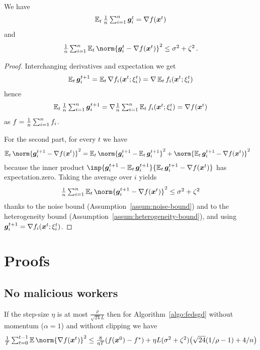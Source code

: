 \documentclass{article}
\begin{document}
\begin{lemma}\label{lem:gradient-bounds}
  We have
  \[
    \operatorname{\operatorname{\mathbb{E}}}_t \tfrac{1}{n} \textstyle\sum_{i=1}^n \bm{g}_i^t = \nabla f(\bm{x}^t)
  \]
  and
  \[
    \tfrac{1}{n} \tsum_{i=1}^n \E_t \norm{\gg_i^t - \nabla f(\xx^t)}^2 \le \sigma^2 + \zeta^2 \, .
  \]
\end{lemma}

\begin{proof}
  Interchanging derivatives and expectation we get
  \[
    \operatorname{\operatorname{\mathbb{E}}}_t \bm{g}_i^{t+1} 
    = \operatorname{\operatorname{\mathbb{E}}}_t \nabla f_i(\bm{x}^t; \xi_i^t)
    = \nabla \operatorname{\operatorname{\mathbb{E}}}_t f_i(\bm{x}^t; \xi_i^t)
  \]
  hence
  \[
    \operatorname{\operatorname{\mathbb{E}}}_t \tfrac{1}{n} \textstyle\sum_{i=1}^n \bm{g}_i^{t+1}
    =
    \nabla \tfrac{1}{n} \textstyle\sum_{i=1}^n \operatorname{\operatorname{\mathbb{E}}}_t f_i(\bm{x}^t; \xi_i^t)
    =
    \nabla f(\bm{x}^t)    
  \]
  as $f = \tfrac{1}{n} \textstyle\sum_{i=1}^n f_i$.
  
  For the second part, for every $t$ we have
  \begin{align*}
    \E_t \norm{\gg_i^{t+1} - \nabla f(\xx^t)}^2
     & =
    \E_t \norm{\gg_i^{t+1} - \E_t \gg_i^{t+1}}^2
    + \norm{\E_t \gg_i^{t+1} - \nabla f(\xx^t)}^2
  \end{align*}
  because the inner product $\inp{\gg_i^{t+1} - \E_t \gg_i^{t+1}}{\E_t \gg_i^{t+1} - \nabla f(\xx^t)}$ has expectation.zero. Taking the average over $i$ yields
  \[
    \tfrac{1}{n} \tsum_{i=1}^n \E_t \norm{\gg_i^{t+1} - \nabla f(\xx^t)}^2 
     \le 
    \sigma^2 + \zeta^2
  \]
  thanks to the noise bound (Assumption~\ref{assum:noise-bound}) and to the heterogeneity bound (Assumption~\ref{assum:heterogeneity-bound}), and using $\bm{g}_i^{t+1} = \nabla f_i(\bm{x}^t; \xi_i^t)$.

\end{proof}



\section{Proofs}\label{app:proofs}


\subsection{No malicious workers}


\begin{theorem}\label{app:thm:efsgd-convergence}
If the step-size $\eta$ is at most $\tfrac{\rho}{\sqrt{24} L}$ then for Algorithm~\ref{algo:fedsgd} without momentum ($\alpha=1$) and without clipping we have
  \[
    \tfrac{1}{T} \tsum_{t=0}^{t-1} \E \norm{\nabla f(\xx^t)}^2
    \leq
    \tfrac{8}{\eta T}(f(\xx^0) - f^\ast) + \eta L (\sigma^2+\zeta^2) \bigl(\sqrt{24} (1/\rho-1) + 4/n\bigr)
  \]
\end{theorem}
\end{document}

